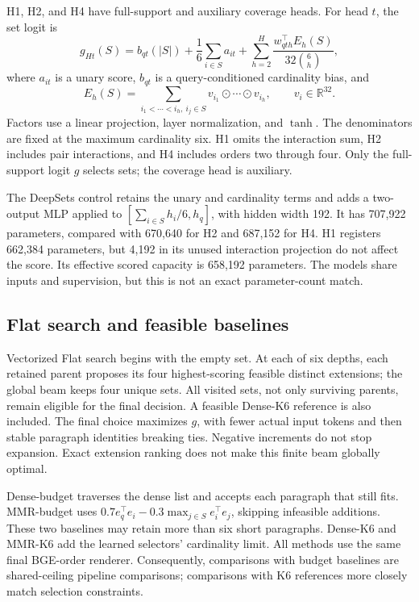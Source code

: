 \documentclass[preprint,12pt]{elsarticle}
\begin{document}
H1, H2, and H4 have full-support and auxiliary coverage heads. For head $t$, the set logit is
\begin{equation}\label{eq:score}
g_{Ht}(S)=b_{qt}(|S|)+\frac{1}{6}\sum_{i\in S}a_{it}
+\sum_{h=2}^{H}\frac{w_{qth}^{\top}E_h(S)}{32\binom{6}{h}},
\end{equation}
where $a_{it}$ is a unary score, $b_{qt}$ is a query-conditioned cardinality bias, and
\begin{equation}
E_h(S)=\sum_{i_1<\cdots<i_h,\ i_j\in S}
v_{i_1}\odot\cdots\odot v_{i_h},\qquad v_i\in\mathbb R^{32}.
\end{equation}
Factors use a linear projection, layer normalization, and $\tanh$. The denominators are fixed at the maximum cardinality six. H1 omits the interaction sum, H2 includes pair interactions, and H4 includes orders two through four. Only the full-support logit $g$ selects sets; the coverage head is auxiliary.

The DeepSets control retains the unary and cardinality terms and adds a two-output MLP applied to $[\sum_{i\in S}h_i/6,h_q]$, with hidden width 192. It has 707,922 parameters, compared with 670,640 for H2 and 687,152 for H4. H1 registers 662,384 parameters, but 4,192 in its unused interaction projection do not affect the score. Its effective scored capacity is 658,192 parameters. The models share inputs and supervision, but this is not an exact parameter-count match.

\subsection{Flat search and feasible baselines}
Vectorized Flat search begins with the empty set. At each of six depths, each retained parent proposes its four highest-scoring feasible distinct extensions; the global beam keeps four unique sets. All visited sets, not only surviving parents, remain eligible for the final decision. A feasible Dense-K6 reference is also included. The final choice maximizes $g$, with fewer actual input tokens and then stable paragraph identities breaking ties. Negative increments do not stop expansion. Exact extension ranking does not make this finite beam globally optimal.

Dense-budget traverses the dense list and accepts each paragraph that still fits. MMR-budget uses $0.7e_q^\top e_i-0.3\max_{j\in S}e_i^\top e_j$, skipping infeasible additions. These two baselines may retain more than six short paragraphs. Dense-K6 and MMR-K6 add the learned selectors' cardinality limit. All methods use the same final BGE-order renderer. Consequently, comparisons with budget baselines are shared-ceiling pipeline comparisons; comparisons with K6 references more closely match selection constraints.
\end{document}
